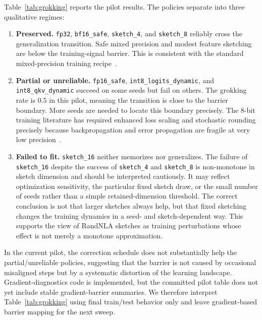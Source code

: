 Table~\ref{tab:grokking} reports the pilot results. The policies separate into three qualitative regimes:
\begin{enumerate}
    \item \textbf{Preserved.} \texttt{fp32}, \texttt{bf16\_safe}, \texttt{sketch\_4}, and \texttt{sketch\_8} reliably cross the generalization transition. Safe mixed precision and modest feature sketching are below the training-signal barrier. This is consistent with the standard mixed-precision training recipe~\autocite{MicikeviciusEtAl2018}.
    \item \textbf{Partial or unreliable.} \texttt{fp16\_safe}, \texttt{int8\_logits\_dynamic}, and \texttt{int8\_qkv\_dynamic} succeed on some seeds but fail on others. The grokking rate is $0.5$ in this pilot, meaning the transition is close to the barrier boundary. More seeds are needed to locate this boundary precisely. The 8-bit training literature has required enhanced loss scaling and stochastic rounding precisely because backpropagation and error propagation are fragile at very low precision~\autocite{WangEtAl2018EightBit}.
    \item \textbf{Failed to fit.} \texttt{sketch\_16} neither memorizes nor generalizes. The failure of \texttt{sketch\_16} despite the success of \texttt{sketch\_4} and \texttt{sketch\_8} is non-monotone in sketch dimension and should be interpreted cautiously. It may reflect optimization sensitivity, the particular fixed sketch draw, or the small number of seeds rather than a simple retained-dimension threshold. The correct conclusion is not that larger sketches always help, but that fixed sketching changes the training dynamics in a seed- and sketch-dependent way. This supports the view of RandNLA sketches as training perturbations whose effect is not merely a monotone approximation.
\end{enumerate}

In the current pilot, the correction schedule does not substantially help the partial/unreliable policies, suggesting that the barrier is not caused by occasional misaligned steps but by a systematic distortion of the learning landscape. Gradient-diagnostics code is implemented, but the committed pilot table does not yet include stable gradient-barrier summaries. We therefore interpret Table~\ref{tab:grokking} using final train/test behavior only and leave gradient-based barrier mapping for the next sweep.

